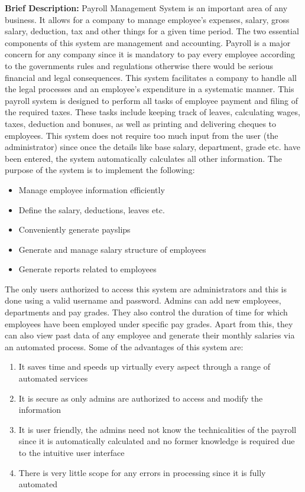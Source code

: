 \documentclass[12pt]{article}
\begin{document}
\noindent
\textbf{Brief Description:}
\newline
\newline
Payroll Management System is an important area of any business. It allows for a company to manage employee's expenses, salary, gross salary, deduction, tax and other things for a given time period. The two essential components of this system are management and accounting. Payroll is a major concern for any company since it is mandatory to pay every employee according to the governments rules and regulations otherwise there would be serious financial and legal consequences. This system facilitates a company to handle all the legal processes and an employee's expenditure in a systematic manner.
\newline
\newline
This payroll system is designed to perform all tasks of employee payment and filing of the required taxes. These tasks include keeping track of leaves, calculating wages, taxes, deduction and bonuses, as well as printing and delivering cheques to employees. This system does not require too much input from the user (the administrator) since once the details like base salary, department, grade etc. have been entered, the system automatically calculates all other information.
\newline
\newline
The purpose of the system is to implement the following:
\begin{itemize}
    \item Manage employee information efficiently
    \item Define the salary, deductions, leaves etc.
    \item Conveniently generate payslips
    \item Generate and manage salary structure of employees
    \item Generate reports related to employees
\end{itemize}
\noindent
The only users authorized to access this system are administrators and this is done using a valid username and password. Admins can add new employees, departments and pay grades. They also control the duration of time for which employees have been employed under specific pay grades. Apart from this, they can also view past data of any employee and generate their monthly salaries via an automated process.
\newline
\newline
\noindent
Some of the advantages of this system are:
\begin{enumerate}
    \item It saves time and speeds up virtually every aspect through a range of automated services
    \item It is secure as only admins are authorized to access and modify the information
    \item It is user friendly, the admins need not know the technicalities of the payroll since it is automatically calculated and no former knowledge is required due to the intuitive user interface
    \item There is very little scope for any errors in processing since it is fully automated
\end{enumerate}
\end{document}
